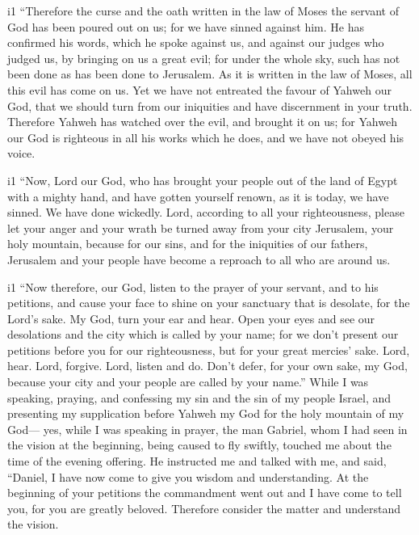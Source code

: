 i1 ``Therefore the curse and the oath written in the law of Moses the
servant of God has been poured out on us; for we have sinned against
him.  He has confirmed his words, which he spoke against
us, and against our judges who judged us, by bringing on us a great
evil; for under the whole sky, such has not been done as has been done
to Jerusalem.  As it is written in the law of Moses, all
this evil has come on us. Yet we have not entreated the favour of Yahweh
our God, that we should turn from our iniquities and have discernment in
your truth.  Therefore Yahweh has watched over the evil,
and brought it on us; for Yahweh our God is righteous in all his works
which he does, and we have not obeyed his voice.

i1 ``Now, Lord our God, who has brought your people out of
the land of Egypt with a mighty hand, and have gotten yourself renown,
as it is today, we have sinned. We have done wickedly. 
Lord, according to all your righteousness, please let your anger and
your wrath be turned away from your city Jerusalem, your holy mountain,
because for our sins, and for the iniquities of our fathers, Jerusalem
and your people have become a reproach to all who are around us.

i1 ``Now therefore, our God, listen to the prayer of your
servant, and to his petitions, and cause your face to shine on your
sanctuary that is desolate, for the Lord's sake.  My God,
turn your ear and hear. Open your eyes and see our desolations and the
city which is called by your name; for we don't present our petitions
before you for our righteousness, but for your great mercies' sake.
 Lord, hear. Lord, forgive. Lord, listen and do. Don't
defer, for your own sake, my God, because your city and your people are
called by your name.''  While I was speaking, praying, and
confessing my sin and the sin of my people Israel, and presenting my
supplication before Yahweh my God for the holy mountain of my God---
 yes, while I was speaking in prayer, the man Gabriel, whom
I had seen in the vision at the beginning, being caused to fly swiftly,
touched me about the time of the evening offering.  He
instructed me and talked with me, and said, ``Daniel, I have now come to
give you wisdom and understanding.  At the beginning of
your petitions the commandment went out and I have come to tell you, for
you are greatly beloved. Therefore consider the matter and understand
the vision.

